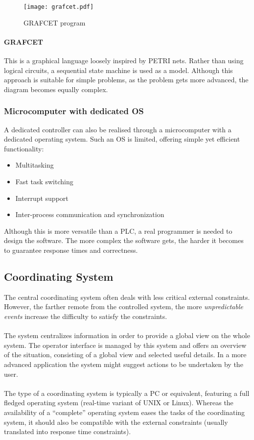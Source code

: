 \documentclass[../main.tex]{subfiles}
\begin{document}
\begin{figure}[H]
    \centering
    \texttt{[image: grafcet.pdf]}
    \caption{GRAFCET program}
    \label{grafcet}
\end{figure}
\paragraph{GRAFCET} This is a graphical language loosely inspired by PETRI nets. Rather than using logical circuits, a sequential state machine is used as a model. Although this approach is suitable for simple problems, as the problem gets more advanced, the diagram becomes equally complex.

\subsubsection{Microcomputer with dedicated OS}
A dedicated controller can also be realised through a microcomputer with a dedicated operating system. Such an OS is limited, offering simple yet efficient functionality:
\begin{itemize}
	\item Multitasking
	\item Fast task switching
	\item Interrupt support
	\item Inter-process communication and synchronization
\end{itemize}
Although this is more versatile than a PLC, a real programmer is needed to design the software. The more complex the software gets, the harder it becomes to guarantee response times and correctness.

\subsection{Coordinating System}
The central coordinating system often deals with less critical external constraints. However, the farther remote from the controlled system, the more \textit{unpredictable events} increase the difficulty to satisfy the constraints.
\\\\
The system centralizes information in order to provide a global view on the whole system. The operator interface is managed by this system and offers an overview of the situation, consisting of a global view and selected useful details. In a more advanced application the system might suggest actions to be undertaken by the user.
\\\\
The type of a coordinating system is typically a PC or equivalent, featuring a full fledged operating system (real-time variant of UNIX or Linux). Whereas the availability of a ``complete'' operating system eases the tasks of the coordinating system, it should also be compatible with the external constraints (usually translated into response time constraints).
\end{document}
